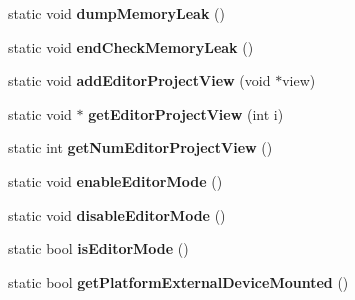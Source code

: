 \begin{DoxyCompactItemize}
\item 
static void {\bfseries dump\+Memory\+Leak} ()\hypertarget{class_i_dream_sky_1_1_stage_aadbd50e8c041b0da6e34066b8f7587e8}{}\label{class_i_dream_sky_1_1_stage_aadbd50e8c041b0da6e34066b8f7587e8}

\item 
static void {\bfseries end\+Check\+Memory\+Leak} ()\hypertarget{class_i_dream_sky_1_1_stage_a0a98f08a9ad19b9691c80bb0ca7a6f26}{}\label{class_i_dream_sky_1_1_stage_a0a98f08a9ad19b9691c80bb0ca7a6f26}

\item 
static void {\bfseries add\+Editor\+Project\+View} (void $\ast$view)\hypertarget{class_i_dream_sky_1_1_stage_adedd70ffd60f7f8dde1df9e34fb36178}{}\label{class_i_dream_sky_1_1_stage_adedd70ffd60f7f8dde1df9e34fb36178}

\item 
static void $\ast$ {\bfseries get\+Editor\+Project\+View} (int i)\hypertarget{class_i_dream_sky_1_1_stage_a1fed9ec52bda2c942ccbca7291eb61bf}{}\label{class_i_dream_sky_1_1_stage_a1fed9ec52bda2c942ccbca7291eb61bf}

\item 
static int {\bfseries get\+Num\+Editor\+Project\+View} ()\hypertarget{class_i_dream_sky_1_1_stage_a86a9f9e682110e6008a3aaabf5ca8463}{}\label{class_i_dream_sky_1_1_stage_a86a9f9e682110e6008a3aaabf5ca8463}

\item 
static void {\bfseries enable\+Editor\+Mode} ()\hypertarget{class_i_dream_sky_1_1_stage_a2f31736309e896ba8dc15d7b34034831}{}\label{class_i_dream_sky_1_1_stage_a2f31736309e896ba8dc15d7b34034831}

\item 
static void {\bfseries disable\+Editor\+Mode} ()\hypertarget{class_i_dream_sky_1_1_stage_aaf73f616f0a3e53e6cb6055dca2ab1bf}{}\label{class_i_dream_sky_1_1_stage_aaf73f616f0a3e53e6cb6055dca2ab1bf}

\item 
static bool {\bfseries is\+Editor\+Mode} ()\hypertarget{class_i_dream_sky_1_1_stage_ada89910dc5c41de4e38fdcfe2a7580ca}{}\label{class_i_dream_sky_1_1_stage_ada89910dc5c41de4e38fdcfe2a7580ca}

\item 
static bool {\bfseries get\+Platform\+External\+Device\+Mounted} ()\hypertarget{class_i_dream_sky_1_1_stage_abe6189f4c40d62565bb253e0a785e93d}{}\label{class_i_dream_sky_1_1_stage_abe6189f4c40d62565bb253e0a785e93d}

\end{DoxyCompactItemize}
